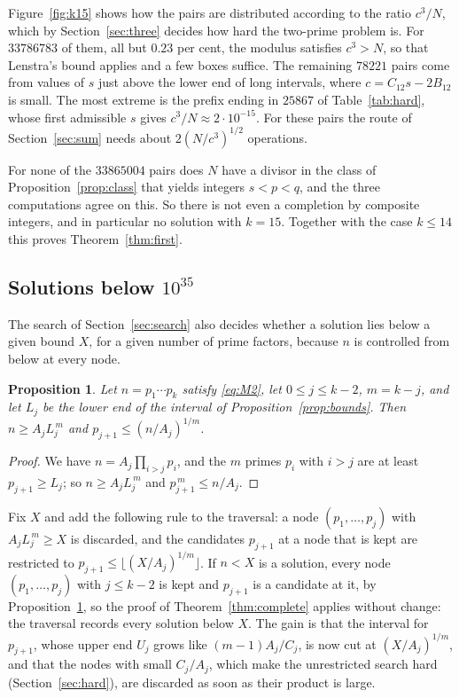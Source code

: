 \documentclass[11pt,reqno]{amsart}
\numberwithin{equation}{section}
\theoremstyle{plain}
\newtheorem{proposition}[theorem]{Proposition}
\theoremstyle{definition}
\theoremstyle{remark}
\begin{document}
Figure~\ref{fig:k15} shows how the pairs are distributed according to
the ratio $c^3/N$, which by Section~\ref{sec:three} decides how hard
the two-prime problem is. For $33786783$ of them, all but $0.23$ per
cent, the modulus satisfies $c^3>N$, so that Lenstra's bound applies
and a few boxes suffice. The remaining $78221$ pairs come from values
of $s$ just above the lower end of long intervals, where
$c=C_{12}s-2B_{12}$ is small. The most extreme is the prefix ending in
$25867$ of Table~\ref{tab:hard}, whose first admissible $s$ gives
$c^3/N\approx2\cdot10^{-15}$. For these pairs the route of
Section~\ref{sec:sum} needs about $2(N/c^3)^{1/2}$ operations.

For none of the $33865004$ pairs does $N$ have a divisor in the class of
Proposition~\ref{prop:class} that yields integers $s<p<q$, and the
three computations agree on this. So there is
not even a completion by composite integers, and in particular no
solution with $k=15$. Together with the case $k\le14$ this proves
Theorem~\ref{thm:first}.

\subsection{Solutions below $10^{35}$}\label{sec:below}
The search of Section~\ref{sec:search} also decides whether a solution
lies below a given bound $X$, for a given number of prime factors,
because $n$ is controlled from below at every node.

\begin{proposition}\label{prop:sizerule}
Let $n=p_1\cdots p_k$ satisfy \eqref{eq:M2}, let $0\le j\le k-2$,
$m=k-j$, and let $L_j$ be the lower end of the interval of
Proposition~\ref{prop:bounds}. Then $n\ge A_jL_j^{\,m}$ and
$p_{j+1}\le(n/A_j)^{1/m}$.
\end{proposition}

\begin{proof}
We have $n=A_j\prod_{i>j}p_i$, and the $m$ primes $p_i$ with $i>j$ are
at least $p_{j+1}\ge L_j$; so $n\ge A_jL_j^{\,m}$ and
$p_{j+1}^{\,m}\le n/A_j$.
\end{proof}

Fix $X$ and add the following rule to the traversal: a node
$(p_1,\dots,p_j)$ with $A_jL_j^{\,m}\ge X$ is discarded, and the
candidates $p_{j+1}$ at a node that is kept are restricted to
$p_{j+1}\le\lfloor(X/A_j)^{1/m}\rfloor$. If $n<X$ is a solution, every
node $(p_1,\dots,p_j)$ with $j\le k-2$ is kept and $p_{j+1}$ is a
candidate at it, by Proposition~\ref{prop:sizerule}, so the proof of
Theorem~\ref{thm:complete} applies without change: the traversal
records every solution below $X$. The gain is that the interval for
$p_{j+1}$, whose upper end $U_j$ grows like $(m-1)A_j/C_j$, is now cut
at $(X/A_j)^{1/m}$, and that the nodes with small $C_j/A_j$, which
make the unrestricted search hard (Section~\ref{sec:hard}), are
discarded as soon as their product is large.
\end{document}
